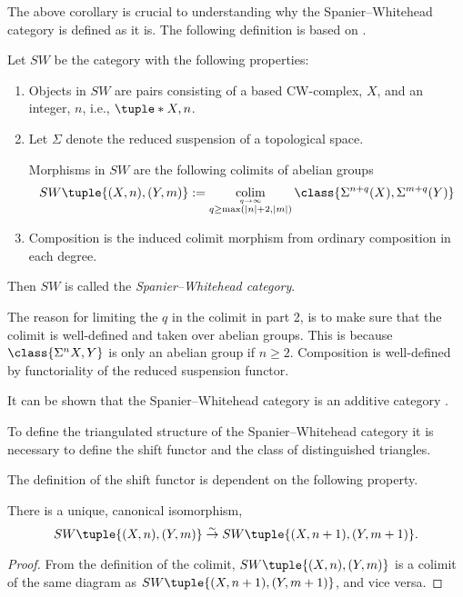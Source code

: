 The above corollary is crucial to understanding why the Spanier--Whitehead category is defined as it is. The following definition is based on \cite[Definition 2]{Schwede_2010}.

\begin{definition}
    \label{def:sw-cat}
    Let \( SW \) be the category with the following properties:
    \begin{enumerate}
        \item {
            Objects in \( SW \) are pairs consisting of a based CW-complex, \( X \), and an integer, \( n \), i.e., \( \tuple*{X, n} \).
        }
        \item {
            Let \( \Sigma \) denote the reduced suspension of a topological space.

            Morphisms in \( SW \) are the following colimits of abelian groups
            \[
                SW\tuple{ (X, n), (Y, m) } := \colim_{\stackrel{q \to \infty}{q \geq \max(|n| + 2, |m|)}} \class{ \Sigma^{n + q}(X), \Sigma^{m + q}(Y) }
            \]
        }
        \item {
            Composition is the induced colimit morphism from ordinary composition in each degree.
        }
    \end{enumerate}

    Then \( SW \) is called the \emph{Spanier--Whitehead category}.
\end{definition}

The reason for limiting the \( q \) in the colimit in part 2, is to make sure that the colimit is well-defined and taken over abelian groups. This is because \( \class{\Sigma^n X, Y} \) is only an abelian group if \( n \geq 2 \). Composition is well-defined by functoriality of the reduced suspension functor.

It can be shown that the Spanier--Whitehead category is an additive category \cite[Proposition 5.7]{Daria_Bachelor}.

To define the triangulated structure of the Spanier--Whitehead category it is necessary to define the shift functor and the class of distinguished triangles.

The definition of the shift functor is dependent on the following property.
\begin{lemma}
    \label{lem:sw_colim_canonical_iso}
    There is a unique, canonical isomorphism,
    \[
        SW\tuple{ (X, n), (Y, m) } \stackrel{\sim}{\to} SW\tuple{ (X, n + 1), (Y, m + 1) }.
    \]
\end{lemma}
\begin{proof}
    From the definition of the colimit, \( SW\tuple{ (X, n), (Y, m) } \) is a colimit of the same diagram as \( SW\tuple{ (X, n + 1), (Y, m + 1) } \), and vice versa.
\end{proof}

